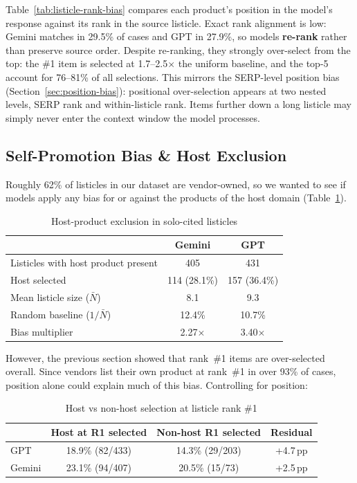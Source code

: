 Table~\ref{tab:listicle-rank-bias} compares each product's position in the model's response against its rank in the source listicle. Exact rank alignment is low: Gemini matches in 29.5\% of cases and GPT in 27.9\%, so models \textbf{re-rank} rather than preserve source order. Despite re-ranking, they strongly over-select from the top: the \#1 item is selected at 1.7--2.5$\times$ the uniform baseline, and the top-5 account for 76--81\% of all selections. This mirrors the SERP-level position bias (Section~\ref{sec:position-bias}): positional over-selection appears at two nested levels, SERP rank and within-listicle rank. Items further down a long listicle may simply never enter the context window the model processes.

\subsection{Self-Promotion Bias \& Host Exclusion}
\label{sec:self-promo}

Roughly 62\% of listicles in our dataset are vendor-owned, so we wanted to see if models apply any bias for or against the products of the host domain (Table~\ref{tab:host-exclusion}).

\begin{table}[H]
\centering
\caption{Host-product exclusion in solo-cited listicles}
\label{tab:host-exclusion}
\begin{tabular}{lcc}
\toprule
& \textbf{Gemini} & \textbf{GPT} \\
\midrule
Listicles with host product present & 405 & 431 \\
Host selected & 114 (28.1\%) & 157 (36.4\%) \\
Mean listicle size ($\bar{N}$) & 8.1 & 9.3 \\
Random baseline ($1/\bar{N}$) & 12.4\% & 10.7\% \\
Bias multiplier & 2.27$\times$ & 3.40$\times$ \\
\bottomrule
\end{tabular}
\end{table}

However, the previous section showed that rank~\#1 items are over-selected overall. Since vendors list their own product at rank~\#1 in over 93\% of cases, position alone could explain much of this bias. Controlling for position:

\begin{table}[H]
\centering
\caption{Host vs non-host selection at listicle rank \#1}
\label{tab:host-position-controlled}
\begin{tabular}{lccc}
\toprule
& \textbf{Host at R1 selected} & \textbf{Non-host R1 selected} & \textbf{Residual} \\
\midrule
GPT  & 18.9\% (82/433)  & 14.3\% (29/203) & +4.7\,pp \\
Gemini & 23.1\% (94/407) & 20.5\% (15/73)  & +2.5\,pp \\
\bottomrule
\end{tabular}
\end{table}

